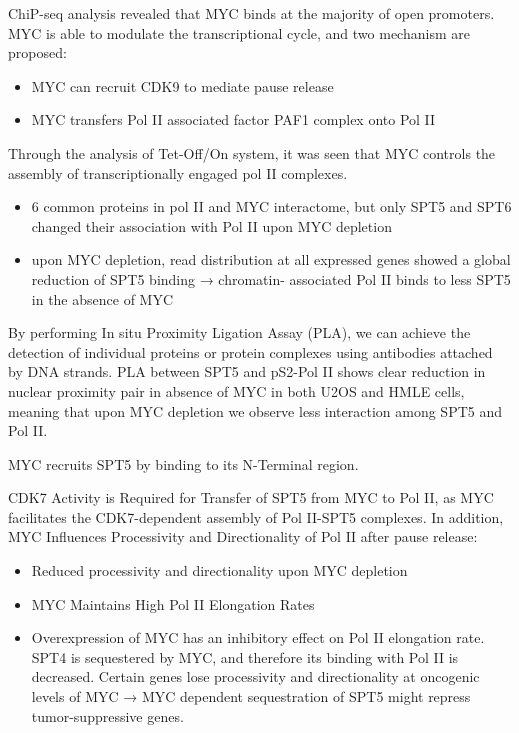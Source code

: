 ChiP-seq analysis revealed that MYC binds at the majority of open promoters. MYC is able to modulate the transcriptional cycle, and two mechanism are
proposed:
\begin{itemize}
\tightlist
\item
  MYC can recruit CDK9 to mediate pause release
\item
  MYC transfers Pol II associated factor PAF1 complex onto Pol II
\end{itemize}

Through the analysis of Tet-Off/On system, it was seen that MYC controls the assembly of transcriptionally engaged pol II complexes.
\begin{itemize}
\tightlist
\item
  6 common proteins in pol II and MYC interactome, but only SPT5 and SPT6 changed their association with Pol II upon MYC depletion
\item
  upon MYC depletion, read distribution at all expressed genes showed a
  global reduction of SPT5 binding → chromatin- associated Pol II binds
  to less SPT5 in the absence of MYC
\end{itemize}

By performing In situ Proximity Ligation Assay (PLA), we can achieve the detection of individual proteins or protein complexes using antibodies attached by DNA strands. PLA between SPT5 and pS2-Pol II shows clear reduction in nuclear proximity pair in absence of MYC in both U2OS and HMLE cells, meaning that upon MYC depletion we observe less interaction among SPT5 and Pol II. 

MYC recruits SPT5 by binding to its N-Terminal region.

CDK7 Activity is Required for Transfer of SPT5 from MYC to Pol II, as MYC facilitates the CDK7-dependent assembly of Pol II-SPT5 complexes.
In addition, MYC Influences Processivity and Directionality of Pol II after pause release:

\begin{itemize}
\tightlist
\item
  Reduced processivity and directionality upon MYC depletion
\item
  MYC Maintains High Pol II Elongation Rates
\item
  Overexpression of MYC has an inhibitory effect on Pol II elongation
  rate. SPT4 is sequestered by MYC, and therefore its binding with Pol
  II is decreased. Certain genes lose processivity and directionality at
  oncogenic levels of MYC → MYC dependent sequestration of SPT5 might
  repress tumor-suppressive genes.
\end{itemize}

